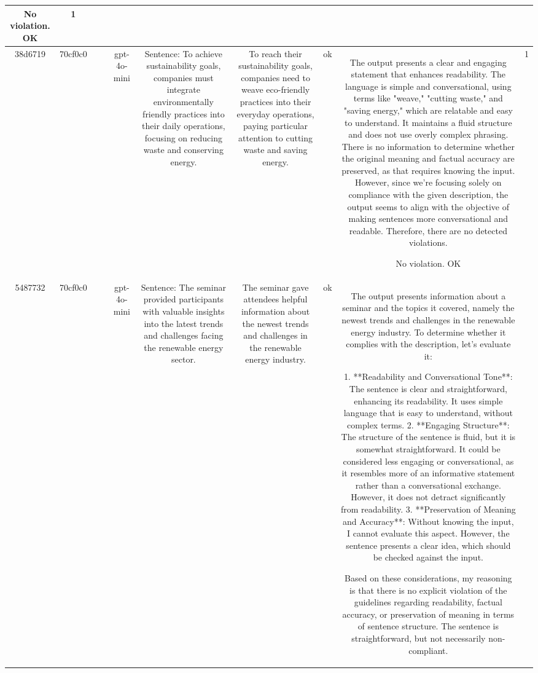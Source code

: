 \begin{table}[h!]
\begin{tabular}{|c|c|c|c|c|c|c|c|c|c|}
No violation.
OK & 1\\
\hline
38d6719 & 70cf0c0 &  &  & gpt-4o-mini & Sentence: To achieve sustainability goals, companies must integrate environmentally friendly practices into their daily operations, focusing on reducing waste and conserving energy. & To reach their sustainability goals, companies need to weave eco-friendly practices into their everyday operations, paying particular attention to cutting waste and saving energy. & ok & The output presents a clear and engaging statement that enhances readability. The language is simple and conversational, using terms like "weave," "cutting waste," and "saving energy," which are relatable and easy to understand. It maintains a fluid structure and does not use overly complex phrasing. There is no information to determine whether the original meaning and factual accuracy are preserved, as that requires knowing the input. However, since we're focusing solely on compliance with the given description, the output seems to align with the objective of making sentences more conversational and readable. Therefore, there are no detected violations.

No violation.
OK & 1\\
\hline
5487732 & 70cf0c0 &  &  & gpt-4o-mini & Sentence: The seminar provided participants with valuable insights into the latest trends and challenges facing the renewable energy sector. & The seminar gave attendees helpful information about the newest trends and challenges in the renewable energy industry. & ok & The output presents information about a seminar and the topics it covered, namely the newest trends and challenges in the renewable energy industry. To determine whether it complies with the description, let's evaluate it:

1. **Readability and Conversational Tone**: The sentence is clear and straightforward, enhancing its readability. It uses simple language that is easy to understand, without complex terms.
2. **Engaging Structure**: The structure of the sentence is fluid, but it is somewhat straightforward. It could be considered less engaging or conversational, as it resembles more of an informative statement rather than a conversational exchange. However, it does not detract significantly from readability.
3. **Preservation of Meaning and Accuracy**: Without knowing the input, I cannot evaluate this aspect. However, the sentence presents a clear idea, which should be checked against the input.

Based on these considerations, my reasoning is that there is no explicit violation of the guidelines regarding readability, factual accuracy, or preservation of meaning in terms of sentence structure. The sentence is straightforward, but not necessarily non-compliant.


\end{tabular}
\end{table}
